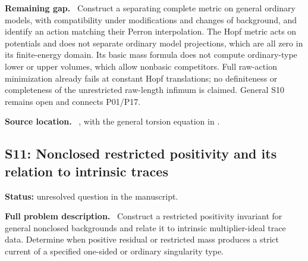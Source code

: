 \documentclass[11pt]{article}
\newcommand{\field}[1]{\par\medskip\noindent\textbf{#1.}\ }
\begin{document}
\field{Remaining gap} Construct a separating complete metric on general ordinary models, with compatibility under modifications and changes of background, and identify an action matching their Perron interpolation. The Hopf metric acts on potentials and does not separate ordinary model projections, which are all zero in its finite-energy domain. Its basic mass formula does not compute ordinary-type lower or upper volumes, which allow nonbasic competitors. Full raw-action minimization already fails at constant Hopf translations; no definiteness or completeness of the unrestricted raw-length infimum is claimed. General S10 remains open and connects P01/P17.
\field{Source location} , with the general torsion equation in .
\subsection{S11: Nonclosed restricted positivity and its relation to intrinsic traces}
\label{S11}
\noindent\textbf{Status:} unresolved question in the manuscript.
\field{Full problem description} Construct a restricted positivity invariant for general nonclosed backgrounds and relate it to intrinsic multiplier-ideal trace data. Determine when positive residual or restricted mass produces a strict current of a specified one-sided or ordinary singularity type.
\end{document}
